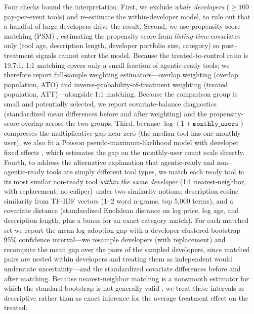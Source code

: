 Four checks bound the interpretation. First, we exclude \emph{whale developers}
($\geq 100$ pay-per-event tools) and re-estimate the within-developer model, to
rule out that a handful of large developers drive the result. Second, we use
propensity score matching (PSM) \cite{rosenbaum1983propensity, stuart2010matching},
estimating the propensity score from \emph{listing-time} covariates only (tool
age, description length, developer portfolio size, category) so post-treatment
signals cannot enter the model. Because the treated-to-control ratio is 19.7:1,
1:1 matching covers only a small fraction of agentic-ready tools; we therefore
report full-sample weighting estimators---overlap weighting (overlap
population, ATO) and inverse-probability-of-treatment weighting (treated
population, ATT)---alongside 1:1 matching. Because the comparison group is
small and potentially selected, we report covariate-balance diagnostics
(standardized mean differences before and after weighting) and the
propensity-score overlap across the two groups. Third, because
$\log(1+\texttt{monthly\_users})$ compresses the multiplicative gap near zero
(the median tool has one monthly user), we also fit a Poisson
pseudo-maximum-likelihood model with developer fixed effects
\cite{santossilva2006loggravity}, which estimates the gap on the monthly-user
count scale directly. Fourth, to address the
alternative explanation that agentic-ready and non-agentic-ready tools are
simply different tool types, we match each ready tool to its most similar
non-ready tool \emph{within the same developer} (1:1 nearest-neighbor, with
replacement, no caliper) under two similarity notions: description cosine
similarity from TF-IDF vectors (1--2 word n-grams, top 5{,}000 terms), and a
covariate distance (standardized Euclidean distance on log price, log age, and
description length, plus a bonus for an exact category match). For each matched
set we report the mean log-adoption gap with a developer-clustered bootstrap
95\% confidence interval---we resample developers (with replacement) and
recompute the mean gap over the pairs of the sampled developers, since matched
pairs are nested within developers and treating them as independent would
understate uncertainty---and the standardized covariate differences before and
after matching. Because nearest-neighbor matching is a nonsmooth estimator for
which the standard bootstrap is not generally valid
\cite{abadie2006largesample,abadie2008bias}, we treat these intervals as
descriptive rather than as exact inference for the average treatment effect on
the treated.

